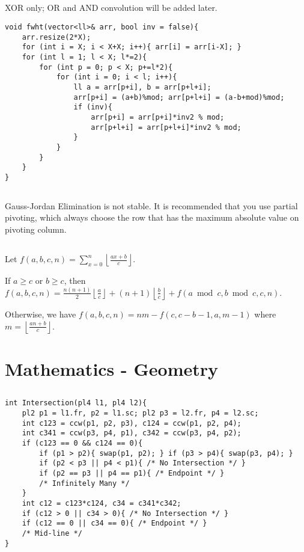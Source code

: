 \documentclass[landscape, 8pt, a4paper, oneside, twocolumn]{extarticle}
\begin{document}
\subsection{}
XOR only; OR and AND convolution will be added later.
\begin{verbatim}
void fwht(vector<ll>& arr, bool inv = false){
    arr.resize(2*X);
    for (int i = X; i < X+X; i++){ arr[i] = arr[i-X]; }
    for (int l = 1; l < X; l*=2){
        for (int p = 0; p < X; p+=l*2){
            for (int i = 0; i < l; i++){
                ll a = arr[p+i], b = arr[p+l+i];
                arr[p+i] = (a+b)%mod; arr[p+l+i] = (a-b+mod)%mod;
                if (inv){
                    arr[p+i] = arr[p+i]*inv2 % mod;
                    arr[p+l+i] = arr[p+l+i]*inv2 % mod;
                }
            }
        }
    }
}
\end{verbatim}
\subsection{}
Gauss-Jordan Elimination is not stable. It is recommended that you use partial pivoting, which always choose the row that has the maximum absolute value on pivoting column.
\subsection{}
Let $f(a, b, c, n) = \sum_{x=0}^{n} \left\lfloor \frac{ax+b}{c} \right\rfloor$.

If $a \ge c$ or $b \ge c$, then $f(a, b, c, n) = \frac{n(n+1)}{2} \left\lfloor \frac{a}{c} \right\rfloor + (n+1) \left\lfloor \frac{b}{c} \right\rfloor + f(a \bmod c, b \bmod c, c, n)$.

Otherwise, we have $f(a, b, c, n) = nm - f(c, c-b-1, a, m-1)$ where $m = \left\lfloor \frac{an+b}{c} \right\rfloor$.
\section{Mathematics - Geometry}
\subsection{}
\begin{verbatim}
int Intersection(pl4 l1, pl4 l2){
    pl2 p1 = l1.fr, p2 = l1.sc; pl2 p3 = l2.fr, p4 = l2.sc;
    int c123 = ccw(p1, p2, p3), c124 = ccw(p1, p2, p4);
    int c341 = ccw(p3, p4, p1), c342 = ccw(p3, p4, p2);
    if (c123 == 0 && c124 == 0){
        if (p1 > p2){ swap(p1, p2); } if (p3 > p4){ swap(p3, p4); }
        if (p2 < p3 || p4 < p1){ /* No Intersection */ }
        if (p2 == p3 || p4 == p1){ /* Endpoint */ }
        /* Infinitely Many */
    }
    int c12 = c123*c124, c34 = c341*c342;
    if (c12 > 0 || c34 > 0){ /* No Intersection */ }
    if (c12 == 0 || c34 == 0){ /* Endpoint */ }
    /* Mid-line */
}
\end{verbatim}
\end{document}
